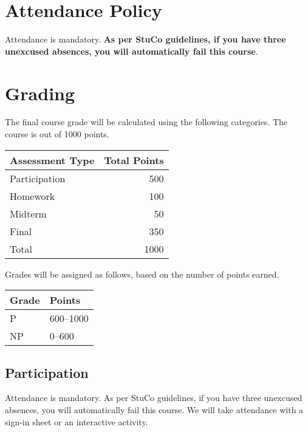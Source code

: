 \documentclass{article}
\begin{document}
\section*{Attendance Policy}

Attendance is mandatory. \textbf{As per StuCo guidelines, if you have three
unexcused absences, you will automatically fail this course}.

\section*{Grading}

The final course grade will be calculated using the following categories. The
course is out of 1000 points.

\begin{center}
    \begin{tabular}{@{}lr@{}}
        Assessment Type     & Total Points \\ \toprule
        Participation       &          500 \\
        Homework            &          100 \\
        Midterm             &           50 \\
        Final               &          350 \\ \midrule
        Total               &         1000 \\ \bottomrule
    \end{tabular}
\end{center}

Grades will be assigned as follows, based on the number of points earned.

\begin{center}
    \begin{tabular}{@{}ll@{}}
        Grade   & Points    \\ \toprule
        P       & 600--1000 \\
        NP      & 0--600    \\ \bottomrule
    \end{tabular}
\end{center}

\subsection*{Participation}

Attendance is mandatory. As per StuCo guidelines, if you have three unexcused
absences, you will automatically fail this course. We will take attendance with
a sign-in sheet or an interactive activity.
\end{document}
